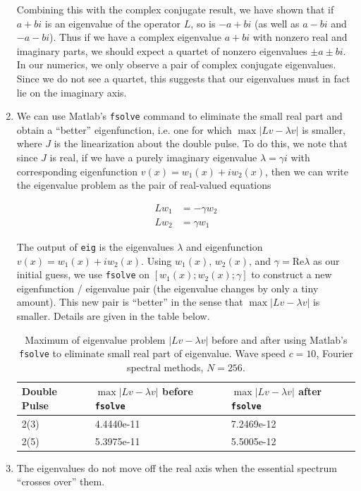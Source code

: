 \documentclass[12pt]{article}
\begin{document}
\begin{enumerate}
Combining this with the complex conjugate result, we have shown that if $a + bi$ is an eigenvalue of the operator $L$, so is $-a + bi$ (as well as $a - bi$ and $-a - bi$). Thus if we have a complex eigenvalue $a + bi$ with nonzero real and imaginary parts, we should expect a quartet of nonzero eigenvalues $\pm a \pm b i$. In our numerics, we only observe a pair of complex conjugate eigenvalues. Since we do not see a quartet, this suggests that our eigenvalues must in fact lie on the imaginary axis.

\item We can use Matlab's \texttt{fsolve} command to eliminate the small real part and obtain a ``better'' eigenfunction, i.e. one for which $\max{|Lv - \lambda v|}$ is smaller, where $J$ is the linearization about the double pulse. To do this, we note that since $J$ is real, if we have a purely imaginary eigenvalue $\lambda = \gamma i$ with corresponding eigenfunction $v(x) = w_1(x) + i w_2(x)$, then we can write the eigenvalue problem as the pair of real-valued equations

\begin{align}\label{realeigproblem}
Lw_1 &= -\gamma w_2 \\
Lw_2 &= \gamma w_1
\end{align}

The output of \texttt{eig} is the eigenvalues $\lambda$ and eigenfunction $v(x) = w_1(x) + i w_2(x)$. Using $w_1(x)$, $w_2(x)$, and $\gamma = \textrm{Re} \lambda$ as our initial guess, we use \texttt{fsolve} on $[w_1(x); w_2(x); \gamma]$ to construct a new eigenfunction / eigenvalue pair (the eigenvalue changes by only a tiny amount). This new pair is ``better'' in the sense that $\max{|Lv - \lambda v|}$ is smaller. Details are given in the table below.

\begin{table}[H]
\begin{tabular}{l|ll}
 Double Pulse   & $\max{|Lv - \lambda v|}$ before \texttt{fsolve} & $\max{|Lv - \lambda v|}$ after \texttt{fsolve}\\ \hline
  2(3) & 4.4440e-11 & 7.2469e-12 \\
  2(5) & 5.3975e-11 & 5.5005e-12 \\
\end{tabular}
\caption{Maximum of eigenvalue problem $|Lv - \lambda v|$ before and after using Matlab's \texttt{fsolve} to eliminate small real part of eigenvalue. Wave speed $c = 10$, Fourier spectral methods, $N = 256$.}
\end{table}

\item The eigenvalues do not move off the real axis when the essential spectrum ``crosses over'' them.

\end{enumerate}
\end{document}
